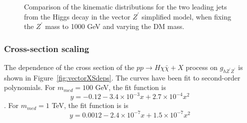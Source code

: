 \begin{figure}[hbpt!]
	\caption{Comparison of the kinematic distributions for the two leading jets from the Higgs decay in the vector $Z^\prime$ simplified model, 
		when fixing the $Z^\prime$ mass to 1000 GeV and varying the DM mass. 
		\label{fig:VectorHbb_1000}}
\end{figure}

\subsubsection{Cross-section scaling}

The dependence of the cross section of the $pp \rightarrow H\chi\bar{\chi}+X$ process 
on $g_{h Z^\prime Z^\prime}$ is shown in Figure~\ref{fig:vectorXSdeps}. 
The curves have been fit to second-order polynomials. 
For $m_{med} = 100$ GeV, the fit function is 
$$y = -0.12 - 3.4\times10^{-3}x + 2.7\times10^{-4}x^2$$.
For $m_{med} = 1$ TeV, the fit function is 
is $$y = 0.0012 - 2.4\times10^{-7}x + 1.5\times10^{-7}x^2$$

